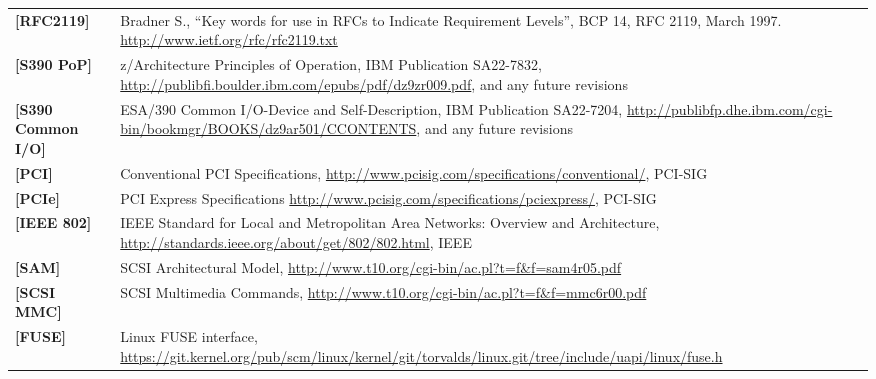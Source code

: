 \begin{longtable}{l p{5in}}
	\label{intro:rfc2119}\textbf{[RFC2119]} &
Bradner S., ``Key words for use in RFCs to Indicate Requirement
Levels'', BCP 14, RFC 2119, March 1997. \newline\url{http://www.ietf.org/rfc/rfc2119.txt}\\
	\label{intro:S390 PoP}\textbf{[S390 PoP]} & z/Architecture Principles of Operation, IBM Publication SA22-7832, \newline\url{http://publibfi.boulder.ibm.com/epubs/pdf/dz9zr009.pdf}, and any future revisions\\
	\label{intro:S390 Common I/O}\textbf{[S390 Common I/O]} & ESA/390 Common I/O-Device and Self-Description, IBM Publication SA22-7204, \newline\url{http://publibfp.dhe.ibm.com/cgi-bin/bookmgr/BOOKS/dz9ar501/CCONTENTS}, and any future revisions\\
	\label{intro:PCI}\textbf{[PCI]} &
	Conventional PCI Specifications,
	\newline\url{http://www.pcisig.com/specifications/conventional/},
	PCI-SIG\\
	\label{intro:PCIe}\textbf{[PCIe]} &
	PCI Express Specifications
	\newline\url{http://www.pcisig.com/specifications/pciexpress/},
	PCI-SIG\\
	\label{intro:IEEE 802}\textbf{[IEEE 802]} &
	IEEE Standard for Local and Metropolitan Area Networks: Overview and Architecture,
	\newline\url{http://standards.ieee.org/about/get/802/802.html},
	IEEE\\
	\label{intro:SAM}\textbf{[SAM]} &
        SCSI Architectural Model,
        \newline\url{http://www.t10.org/cgi-bin/ac.pl?t=f&f=sam4r05.pdf}\\
	\label{intro:SCSI MMC}\textbf{[SCSI MMC]} &
        SCSI Multimedia Commands,
        \newline\url{http://www.t10.org/cgi-bin/ac.pl?t=f&f=mmc6r00.pdf}\\
	\label{intro:FUSE}\textbf{[FUSE]} &
	Linux FUSE interface,
	\newline\url{https://git.kernel.org/pub/scm/linux/kernel/git/torvalds/linux.git/tree/include/uapi/linux/fuse.h}\\

\end{longtable}


